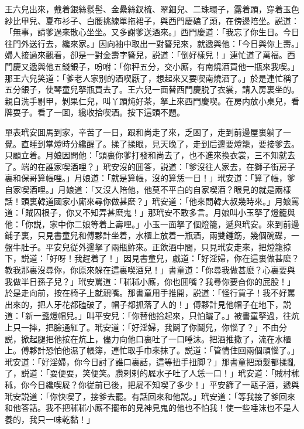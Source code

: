 王六兒出來，戴着銀絲䯼髻、金纍絲釵梳、翠鈿兒、二珠環子，露着頭，穿着玉色紗比甲兒、夏布衫子、白腰挑線單拖裙子，與西門慶磕了頭，在傍邊陪坐。説道：「無事，請爹過來散心坐坐。又多謝爹送酒來。」西門慶道：「我忘了你生日。今日往門外送行去，纔來家。」因向袖中取出一對簪兒來，就遞與他：「今日與你上壽。」婦人接過來觀看，卻是一對金壽字簪兒，説道：「倒好樣兒！」連忙道了萬福。西門慶又遞與他五錢銀子，吩咐：「你秤五分，交小廝，有南燒酒買他一瓶來我喫。」那王六兒笑道：「爹老人家别的酒喫厭了，想起來又要喫南燒酒了。」於是連忙稱了五分銀子，使琴童兒拏瓶買去了。王六兒一面替西門慶脱了衣裳，請入房裏坐的。親自洗手剔甲，剝果仁兒，叫丫頭炖好茶，拏上來西門慶喫。在房内放小桌兒，看牌耍子。看了一囬，纔收拾喫酒。按下這頭不題。

單表玳安囬馬到家，辛苦了一日，跟和尚走了來，乏困了，走到前邊屋裏躺了一覺。直睡到掌燈時分纔醒了。揉了揉眼，見天晚了，走到后邊要燈籠，要接爹去。只顧立着。月娘因問他：「頭裏你爹打發和尚去了，也不進來換衣裳，三不知就去了。端的在誰家喫酒哩？」玳安沒的囬答，説道：「爹沒往人家去，在獅子街房子裏和保哥算帳哩。」月娘道：「就是算帳，沒的算恁一日！」玳安道：「算了帳，爹自家喫酒哩。」月娘道：「又沒人陪他，他莫不平白的自家喫酒？眼見的就是兩樣話！頭裏韓道國家小廝來尋你做甚麽？」玳安道：「他來問韓大叔幾時來。」月娘罵道：「賊囚根子，你又不知弄甚麽鬼！」那玳安不敢多言。月娘叫小玉拏了燈籠與他：「你説，家中你二娘等着上壽哩。」小玉一面拏了個燈籠，遞與玳安。來到前邊鋪子裏，只見書童兒和傅夥計坐着，水櫃上放着一瓶酒，兩雙鍾筯，幾個碗碟，一盤牛肚子。平安兒従外邊拏了兩瓶鮓來。正飲酒中間，只見玳安走來，把燈籠掠下，説道：「好呀！我趕着了！」因見書童兒，戲道：「好淫婦，你在這裏做甚麽？教我那裏沒尋你，你原來躲在這裏喫酒兒！」書童道：「你尋我做甚麽？心裏要與我做半日孫子兒？」玳安罵道：「秫秫小廝，你也囬嘴？我尋你要㒲你的屁股！」於是走向前，按在椅子上就親嘴。那書童用手推開，説道：「怪行貨子！我不好罵出來的，把人牙花都磕破了，帽子都抓落了人的！」傅夥計見他帽子在地下，説道：「新一盞燈帽兒。」叫平安兒：「你替他拾起來，只怕躧了。」被書童拏過，往炕上只一摔，把臉通紅了。玳安道：「好淫婦，我鬬了你鬬兒，你惱了？」不由分説，掀起腿把他按在炕上，儘力向他口裏吐了一口唾沫。把酒推撒了，流在水櫃上。傅夥計恐怕他濕了帳簿，連忙取手巾來抹了。説道：「管情住回兩個頑惱了。」玳安道：「好淫婦，你今日討了誰口裏話，這等扭手扭脚？」那書童把頭髮都揉亂了，説道：「耍便耍，笑便笑。臢剌剌的㞞水子吐了人恁一口！」玳安道：「賊村秫秫，你今日纔喫㞞？你従前已後，把㞞不知喫了多少！」平安篩了一甌子酒，遞與玳安説道：「你快喫了，接爹去罷。有話回來和他説。」玳安道：「等我接了爹回來和他答話。我不把秫秫小廝不擺布的見神見鬼的他也不怕我！使一些唾沫也不是人養的，我只一味乾黏！」

